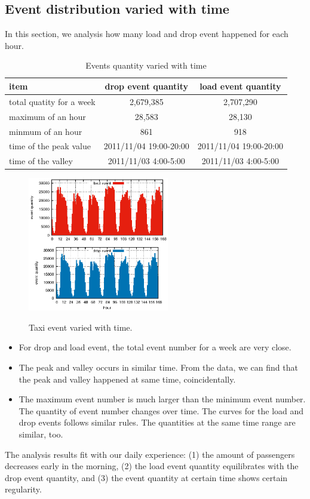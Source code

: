 \subsection{Event distribution varied with time}

In this section, we analysis how many load and drop event happened for each hour.  
\begin{table}[!h]
\caption{Events quantity varied with time}\label{table_event_distribution_with_time}
\centering
\begin{tabular}{l|c|c}
 \hline
 item &drop event quantity &load event quantity \\
  \hline
  total quatity for a week& 2,679,385&2,707,290\\
  maximum of an hour&28,583 &28,130\\
  minmum of an hour&861&918\\
  time of the peak value&2011/11/04 19:00-20:00&2011/11/04 19:00-20:00\\
  time of the valley&2011/11/03 4:00-5:00&2011/11/03 4:00-5:00\\
  \hline
  \end{tabular}
\end{table}


\begin{figure}[!h]
\centering
\includegraphics[width=0.55\textwidth]{figures_201103/assumption/event_w_time.eps}\\
\caption{Taxi event varied with time.}\label{figure_event_varied_w_t}
\end{figure}




\begin{itemize}
  \item For drop and load event, the total event number for a week are very close. \\
  \item The peak and valley occurs in similar time. From the data, we can find that the peak and valley happened at same time, coincidentally.
  \item The maximum event number is much larger than the minimum event number. The quantity of event number changes over time. The curves for the load and drop events follows similar rules. The quantities at the same time range are similar, too.
\end{itemize}

The analysis results fit with our daily experience: (1) the amount of passengers decreases early in the morning, (2) the load event quantity equilibrates with the drop event quantity, and (3) the event quantity at certain time shows certain regularity. 

